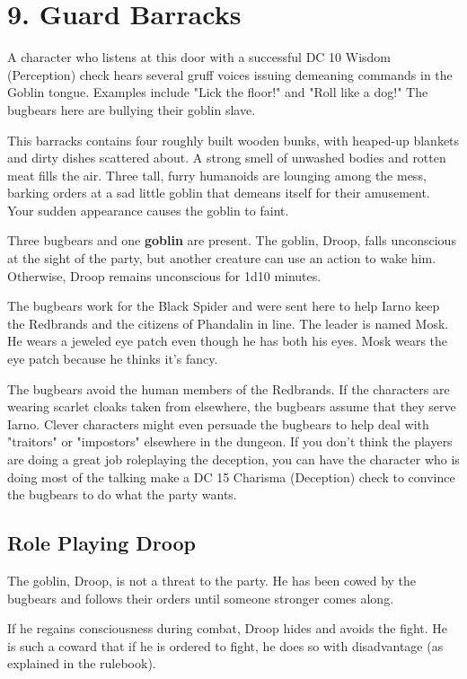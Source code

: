 \documentclass[10pt,a4paper,twoside,bg=print,twocolumn,openany,nodeprecatedcode]{dndbook}
\begin{document}
\section{9. Guard Barracks}
A character who listens at this door with a successful DC 10 Wisdom (Perception) check hears several gruff voices issuing demeaning commands in the Goblin tongue. Examples include "Lick the floor!" and "Roll like a dog!" The bugbears here are bullying their goblin slave.

\begin{DndReadAloud}{}
This barracks contains four roughly built wooden bunks, with heaped-up blankets and dirty dishes scattered about. A strong smell of unwashed bodies and rotten meat fills the air. Three tall, furry humanoids are lounging among the mess, barking orders at a sad little goblin that demeans itself for their amusement. Your sudden appearance causes the goblin to faint.

\end{DndReadAloud}

Three bugbears and one \textbf{goblin} are present. The goblin, Droop, falls unconscious at the sight of the party, but another creature can use an action to wake him. Otherwise, Droop remains unconscious for 1d10 minutes.

The bugbears work for the Black Spider and were sent here to help Iarno keep the Redbrands and the citizens of Phandalin in line. The leader is named Mosk. He wears a jeweled eye patch even though he has both his eyes. Mosk wears the eye patch because he thinks it's fancy.

The bugbears avoid the human members of the Redbrands. If the characters are wearing scarlet cloaks taken from elsewhere, the bugbears assume that they serve Iarno. Clever characters might even persuade the bugbears to help deal with "traitors" or "impostors" elsewhere in the dungeon. If you don't think the players are doing a great job roleplaying the deception, you can have the character who is doing most of the talking make a DC 15 Charisma (Deception) check to convince the bugbears to do what the party wants.

\subsection{Role Playing Droop}
The goblin, Droop, is not a threat to the party. He has been cowed by the bugbears and follows their orders until someone stronger comes along.

If he regains consciousness during combat, Droop hides and avoids the fight. He is such a coward that if he is ordered to fight, he does so with disadvantage (as explained in the rulebook).
\end{document}
